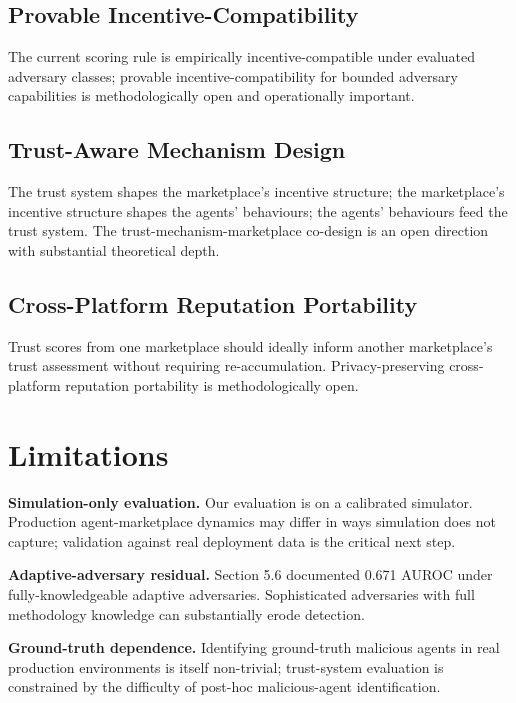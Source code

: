 \documentclass[sigconf,nonacm]{acmart}
\begin{document}
\subsection{Provable Incentive-Compatibility}

The current scoring rule is empirically incentive-compatible
under evaluated adversary classes; provable incentive-compatibility
for bounded adversary capabilities is methodologically open and
operationally important.

\subsection{Trust-Aware Mechanism Design}

The trust system shapes the marketplace's incentive structure;
the marketplace's incentive structure shapes the agents' behaviours;
the agents' behaviours feed the trust system. The
trust-mechanism-marketplace co-design is an open direction with
substantial theoretical depth.

\subsection{Cross-Platform Reputation Portability}

Trust scores from one marketplace should ideally inform another
marketplace's trust assessment without requiring re-accumulation.
Privacy-preserving cross-platform reputation portability is
methodologically open.

\section{Limitations}

\textbf{Simulation-only evaluation.} Our evaluation is on a
calibrated simulator. Production agent-marketplace dynamics may
differ in ways simulation does not capture; validation against
real deployment data is the critical next step.

\textbf{Adaptive-adversary residual.} Section 5.6 documented
0.671 AUROC under fully-knowledgeable adaptive adversaries.
Sophisticated adversaries with full methodology knowledge can
substantially erode detection.

\textbf{Ground-truth dependence.} Identifying ground-truth
malicious agents in real production environments is itself
non-trivial; trust-system evaluation is constrained by the
difficulty of post-hoc malicious-agent identification.
\end{document}
